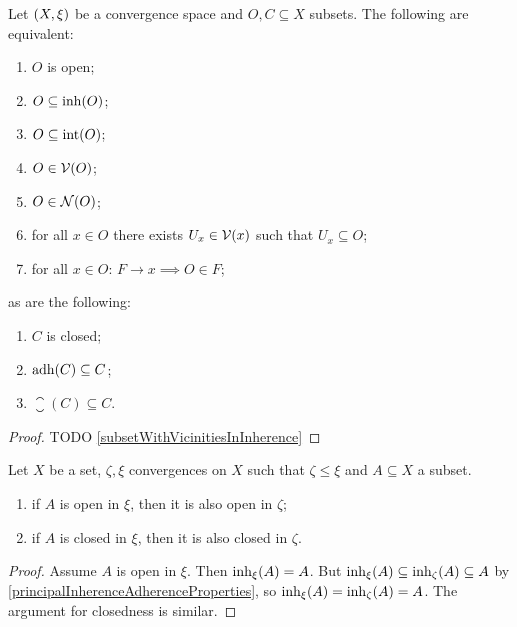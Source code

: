 \begin{lemma} \label{openClosedCriteria}
Let $\left( X,\xi \right)$ be a convergence space and $O,C\subseteq X$ subsets. The following are equivalent:
\begin{enumerate}
\item $O$ is open;
\item $O\subseteq \operatorname{inh}(O)$;
\item $O\subseteq \operatorname{int}(O)$;
\item $O\in \operatorname{\mathcal{V}}(O)$;
\item $O\in \operatorname{\mathcal{N}}(O)$;
\item for all $x\in O$ there exists $U_x\in \operatorname{\mathcal{V}}(x)$ such that $U_x\subseteq O$;
\item for all $x\in O$: $F\to x \implies O\in F$;
\end{enumerate}
as are the following:
\begin{enumerate}
\item $C$ is closed;
\item $\operatorname{adh}(C)\subseteq C$;
\item $\closure(C)\subseteq C$.
\end{enumerate}
\end{lemma}
\begin{proof}
TODO \ref{subsetWithVicinitiesInInherence}
\end{proof}

\begin{lemma}
Let $X$ be a set, $\zeta, \xi$ convergences on $X$ such that $\zeta\leq\xi$ and $A\subseteq X$ a subset.
\begin{enumerate}
\item if $A$ is open in $\xi$, then it is also open in $\zeta$;
\item if $A$ is closed in $\xi$, then it is also closed in $\zeta$.
\end{enumerate}
\end{lemma}
\begin{proof}
Assume $A$ is open in $\xi$. Then $\operatorname{inh}_\xi(A) = A$. But $\operatorname{inh}_\xi(A) \subseteq \operatorname{inh}_\zeta(A) \subseteq A$ by \ref{principalInherenceAdherenceProperties}, so $\operatorname{inh}_\xi(A) = \operatorname{inh}_\zeta(A) = A$. The argument for closedness is similar.
\end{proof}

